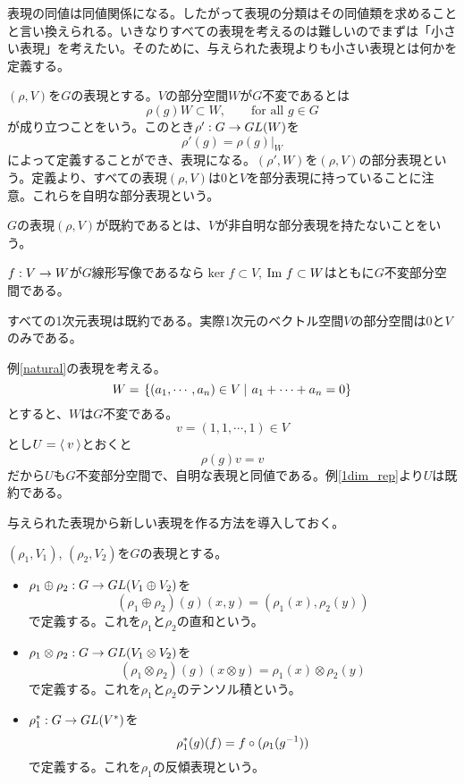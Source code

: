 \documentclass{ltjsreport}
\begin{document}
表現の同値は同値関係になる。したがって表現の分類はその同値類を求めることと言い換えられる。いきなりすべての表現を考えるのは難しいのでまずは「小さい表現」を考えたい。そのために、与えられた表現よりも小さい表現とは何かを定義する。

\begin{defin}
  $(\rho,V)$を$G$の表現とする。$V$の部分空間$W$が$G$不変であるとは
  \[
  \rho(g)W\subset W,\qquad \text{for all $g\in G$}  
  \]
  が成り立つことをいう。このとき$\rho':G\rightarrow GL(W)$を
  \[
  \rho'(g)=\rho(g)|_W  
  \]
  によって定義することができ、表現になる。$(\rho',W)$を$(\rho, V)$の部分表現という。定義より、すべての表現$(\rho, V)$は$0$と$V$を部分表現に持っていることに注意。これらを自明な部分表現という。
\end{defin}

\begin{defin}
  $G$の表現$(\rho, V)$が既約であるとは、$V$が非自明な部分表現を持たないことをいう。
\end{defin}

\begin{eg}\label{ker_im}
  $f:V\rightarrow W$が$G$線形写像であるなら$\ker f\subset V$, $\text{Im } f\subset W$はともに$G$不変部分空間である。
\end{eg}

\begin{eg}\label{1dim_rep}
  すべての1次元表現は既約である。実際1次元のベクトル空間$V$の部分空間は$0$と$V$のみである。
\end{eg}

\begin{eg}
  例\ref{natural}の表現を考える。
  \[
  W=\left.\left\{(a_1,\cdots,a_n)\in V \: \right| \: a_1+\cdots+a_n=0\right\}  
  \]
  とすると、$W$は$G$不変である。
  \[
  v=(1,1,\cdots,1)\in V  
  \]
  とし$U=\langle\:v\:\rangle$とおくと
  \[
  \rho(g)v=v  
  \]
  だから$U$も$G$不変部分空間で、自明な表現と同値である。例\ref{1dim_rep}より$U$は既約である。
\end{eg}

与えられた表現から新しい表現を作る方法を導入しておく。
\begin{defin}
  $(\rho_1,V_1)$, $(\rho_2,V_2)$を$G$の表現とする。
  \begin{itemize}
    \item $\rho_1\oplus\rho_2:G\rightarrow GL(V_1\oplus V_2)$を
    \[
    (\rho_1\oplus\rho_2)(g)(x,y)=(\rho_1(x),\rho_2(y))
    \]
    で定義する。これを$\rho_1$と$\rho_2$の直和という。

    \item $\rho_1\otimes\rho_2:G\rightarrow GL(V_1\otimes V_2)$を
    \[
    (\rho_1\otimes\rho_2)(g)(x\otimes y)=\rho_1(x)\otimes\rho_2(y)
    \]
    で定義する。これを$\rho_1$と$\rho_2$のテンソル積という。

    \item $\rho_1^*:G\rightarrow GL(V^*)$を
    \[
    \rho_1^*(g)(f)=f\circ (\rho_1(g^{-1}))
    \]
    で定義する。これを$\rho_1$の反傾表現という。
  \end{itemize}
\end{defin}
\end{document}
